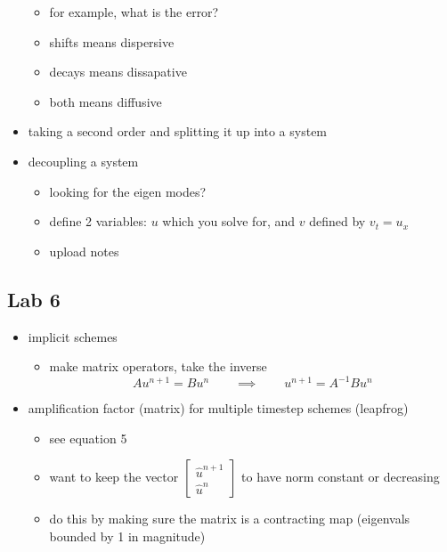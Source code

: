 \documentclass[
]{article}
\providecommand{\tightlist}{%
  \setlength{\itemsep}{0pt}\setlength{\parskip}{0pt}}
\begin{document}
\begin{itemize}
  \begin{itemize}
  \tightlist
  \item
    for example, what is the error?
  \item
    shifts means dispersive
  \item
    decays means dissapative
  \item
    both means diffusive
  \end{itemize}
\item
  taking a second order and splitting it up into a system
\item
  decoupling a system

  \begin{itemize}
  \tightlist
  \item
    looking for the eigen modes?
  \item
    define 2 variables: \(u\) which you solve for, and \(v\) defined by
    \(v_t = u_x\)
  \item
    \textcite{joel} upload notes
  \end{itemize}
\end{itemize}

\hypertarget{lab-6}{%
\subsection{Lab 6}\label{lab-6}}

\begin{itemize}
\tightlist
\item
  implicit schemes

  \begin{itemize}
  \tightlist
  \item
    make matrix operators, take the inverse \[
    A u^{n+1} = B u^n
    \qquad\implies\qquad
    u^{n+1} = A^{-1} B u^n     
    \]
  \end{itemize}
\item
  amplification factor (matrix) for multiple timestep schemes (leapfrog)

  \begin{itemize}
  \tightlist
  \item
    see equation 5
  \item
    want to keep the vector
    \(\left[ \begin{smallmatrix} \hat{u}^{n+1} \\ \hat{u}^n \end{smallmatrix} \right]\)
    to have norm constant or decreasing
  \item
    do this by making sure the matrix is a contracting map (eigenvals
    bounded by 1 in magnitude)
  \end{itemize}
\end{itemize}
\end{document}
